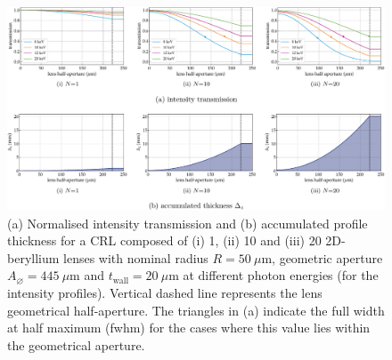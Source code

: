 \begin{refsection}
\begin{figure}[t]
    \centering
    \includegraphics[width=1\linewidth]{figures/ch03/Aeff.pdf}
    \caption[Intensity transmission and accumulated thickness profile of CRLs]{(a) Normalised intensity transmission and (b) accumulated profile thickness for a CRL composed of ($\mathrm{i}$) 1, ($\mathrm{ii}$) 10 and ($\mathrm{iii}$) 20 2D-beryllium lenses with nominal radius $R=50~\mu\text{m}$, geometric aperture $A_{\diameter}=445~\mu\text{m}$ and $t_\text{wall}=20~\mu$m at different photon energies (for the intensity profiles). Vertical dashed line represents the lens geometrical half-aperture. The triangles in (a) indicate the full width at half maximum (fwhm) for the cases where this value lies within the geometrical aperture.}
    \label{fig:EffectiveAperure}
\end{figure}


\end{refsection}
